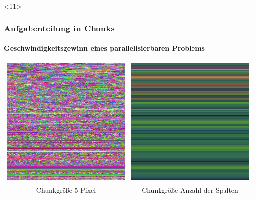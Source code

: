 \documentclass{beamer}
\begin{document}
\begin{frame}<11>
  \frametitle{Aufgabenteilung in Chunks}
  \framesubtitle{Geschwindigkeitsgewinn eines parallelisierbaren Problems}
  
  \begin{center}
    \begin{table}[]
      \begin{tabular}{cc}
        \includegraphics[scale=0.25]{chunksmall} & \includegraphics[scale=0.25]{chunkbig} \\
        Chunkgröße 5 Pixel & Chunkgröße Anzahl der Spalten 
      \end{tabular}
    \end{table}
  \end{center}

\end{frame}
\end{document}
